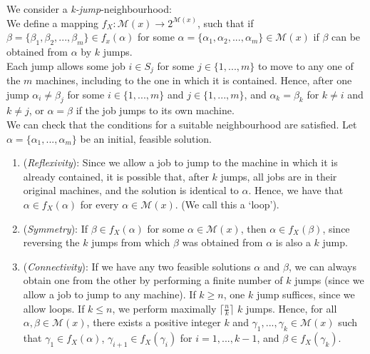 \documentclass[12pt,a4paper,reqno]{article}
\begin{document}
We consider a \textit{k-jump}-neighbourhood: \\

We define a mapping $f_X: \mathcal{M}(x) \rightarrow 2^{\mathcal{M}(x)}$, such that if $\beta = \{\beta_1,\beta_2,...,\beta_m \} \in f_x(\alpha)$ for some $\alpha = \{\alpha_1,\alpha_2,...,\alpha_m \} \in \mathcal{M}(x)$ if $\beta$ can be obtained from $\alpha$ by $k$ jumps. \\

Each jump allows some job $i \in S_j$ for some $j \in \{1,...,m\}$ to move to any one of the $m$ machines, including to the one in which it is contained. Hence, after one jump $\alpha_i \neq \beta_j$ for some $i \in \{1,...,m\}$ and $j \in \{1,...,m\}$, and $\alpha_k = \beta_k$ for $k \neq i$ and $k \neq j$, or $\alpha = \beta$ if the job jumps to its own machine. \\

We can check that the conditions for a suitable neighbourhood are satisfied. Let $\alpha = \{\alpha_1,...,\alpha_m\}$ be an initial, feasible solution.
\begin{enumerate}

\item (\textit{Reflexivity}): Since we allow a job to jump to the machine in which it is already contained, it is possible that, after $k$ jumps, all jobs are in their original machines, and the solution is identical to $\alpha$. Hence, we have that $\alpha \in f_X(\alpha)$ for every $\alpha \in \mathcal{M}(x)$. (We call this a `loop').

\item (\textit{Symmetry}): If $\beta \in f_X(\alpha)$ for some $\alpha \in \mathcal{M}(x)$, then $\alpha \in f_X(\beta)$, since reversing the $k$ jumps from which $\beta$ was obtained from $\alpha$ is also a $k$ jump.

\item (\textit{Connectivity}): If we have any two feasible solutions $\alpha$ and $\beta$, we can always obtain one from the other by performing a finite number of $k$ jumps (since we allow a job to jump to any machine). If $k \geq n$, one $k$ jump suffices, since we allow loops. If $k \leq n$, we perform maximally $\lceil \frac{n}{k} \rceil$ $k$ jumps. Hence, for all $\alpha, \beta \in \mathcal{M}(x)$, there exists a positive integer $k$ and $\gamma_1,...,\gamma_k \in \mathcal{M}(x)$ such that $\gamma_1 \in f_X(\alpha)$, $\gamma_{i+1} \in f_X(\gamma_i)$ for $i=1,...,k-1$, and $\beta \in f_X(\gamma_k)$.

\end{enumerate}
\end{document}
